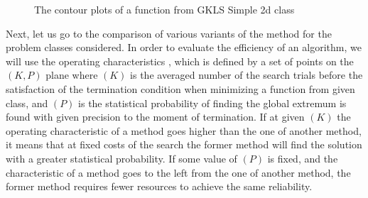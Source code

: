 \documentclass[procedia]{easychair}
\begin{document}
\begin{figure}[ht]
    \centering
    \qquad
    \caption{The contour plots of a function from GKLS Simple 2d class}
    \label{fig:gkls_isolines}
\end{figure}
\par
Next, let us go to the comparison of various variants of the method for the problem
classes considered. In order to evaluate the efficiency of an algorithm, we will use
the operating characteristics \cite{grishaginClass}, which is defined by a set of points on the \((K, P)\)
plane where \((K)\) is the averaged number of the search trials before the satisfaction
of the termination condition when minimizing a function from given class, and \((P)\)
is the statistical probability of finding the global extremum is found with given
precision to the moment of termination. If at given \((K)\) the operating characteristic
of a method goes higher than the one of another method, it means that at fixed costs
of the search the former method will find the solution with a greater statistical probability.
If some value of \((P)\) is fixed, and the characteristic of a method goes to the left from
the one of another method, the former method requires fewer resources to achieve the same reliability.
\end{document}
